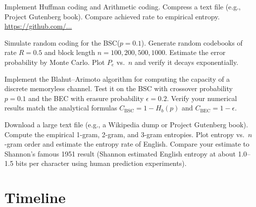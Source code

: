 \begin{exercise}[Computational]
Implement Huffman coding and Arithmetic coding. Compress a text file (e.g., Project Gutenberg book). Compare achieved rate to empirical entropy. \url{https://github.com/...}
\end{exercise}

\begin{exercise}[Computational]
Simulate random coding for the BSC($p=0.1$). Generate random codebooks of rate $R=0.5$ and block length $n=100, 200, 500, 1000$. Estimate the error probability by Monte Carlo. Plot $P_e$ vs.\ $n$ and verify it decays exponentially.
\end{exercise}

\begin{exercise}[Computational]
Implement the Blahut--Arimoto algorithm for computing the capacity of a discrete memoryless channel. Test it on the BSC with crossover probability $p=0.1$ and the BEC with erasure probability $\epsilon=0.2$. Verify your numerical results match the analytical formulas $C_{\text{BSC}} = 1 - H_b(p)$ and $C_{\text{BEC}} = 1 - \epsilon$.
\end{exercise}

\begin{exercise}[Computational]
Download a large text file (e.g., a Wikipedia dump or Project Gutenberg book). Compute the empirical 1-gram, 2-gram, and 3-gram entropies. Plot entropy vs.\ $n$-gram order and estimate the entropy rate of English. Compare your estimate to Shannon's famous 1951 result (Shannon estimated English entropy at about 1.0--1.5 bits per character using human prediction experiments).
\end{exercise}

\section{Timeline}
\label{sec:information:timeline}


